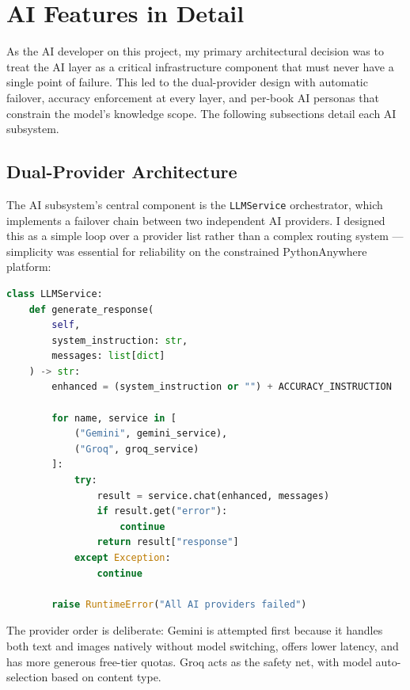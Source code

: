 \documentclass[11pt,a4paper]{article}
\begin{document}
\section{AI Features in Detail}
\label{sec:ai-features}

As the AI developer on this project, my primary architectural decision was to treat the AI layer as a critical infrastructure component that must never have a single point of failure. This led to the dual-provider design with automatic failover, accuracy enforcement at every layer, and per-book AI personas that constrain the model's knowledge scope. The following subsections detail each AI subsystem.

\subsection{Dual-Provider Architecture}

The AI subsystem's central component is the \texttt{LLMService} orchestrator, which implements a failover chain between two independent AI providers. I designed this as a simple loop over a provider list rather than a complex routing system — simplicity was essential for reliability on the constrained PythonAnywhere platform:

\begin{lstlisting}[language=Python, caption=LLMService orchestrator with automatic failover]
class LLMService:
    def generate_response(
        self,
        system_instruction: str,
        messages: list[dict]
    ) -> str:
        enhanced = (system_instruction or "") + ACCURACY_INSTRUCTION

        for name, service in [
            ("Gemini", gemini_service),
            ("Groq", groq_service)
        ]:
            try:
                result = service.chat(enhanced, messages)
                if result.get("error"):
                    continue
                return result["response"]
            except Exception:
                continue

        raise RuntimeError("All AI providers failed")
\end{lstlisting}

The provider order is deliberate: Gemini is attempted first because it handles both text and images natively without model switching, offers lower latency, and has more generous free-tier quotas. Groq acts as the safety net, with model auto-selection based on content type.
\end{document}
